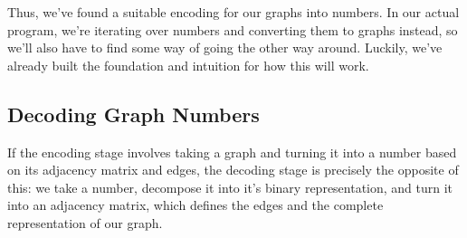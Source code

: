 

Thus, we've found a suitable encoding for our graphs into numbers. In our
actual program, we're iterating over numbers and converting them to graphs
instead, so we'll also have to find some way of going the other way around.
Luckily, we've already built the foundation and intuition for how this will
work.

\subsection{Decoding Graph Numbers}

If the encoding stage involves taking a graph and turning it into a number
based on its adjacency matrix and edges, the decoding stage is precisely the
opposite of this: we take a number, decompose it into it's binary
representation, and turn it into an adjacency matrix, which defines the edges
and the complete representation of our graph.

